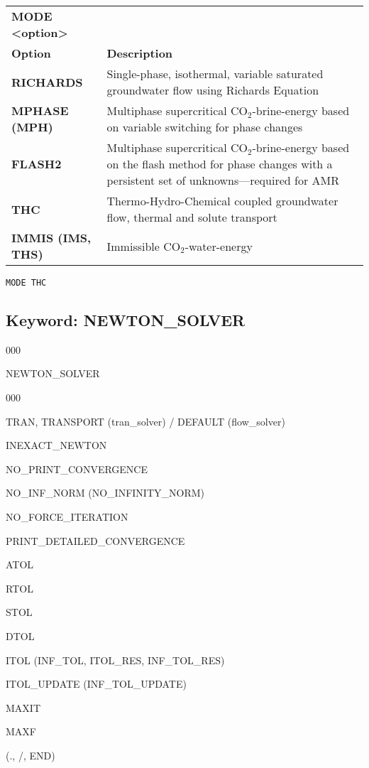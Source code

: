 \documentclass[12pt]{article}
\begin{document}

\begin{center}
\begin{tabularx}{\linewidth}{lX}
\bf MODE <option>\\
\bf Option & \bf Description\\
\bf RICHARDS &Single-phase, isothermal, variable saturated groundwater flow using Richards Equation\\
\bf MPHASE (MPH) &Multiphase supercritical CO$_2$-brine-energy based on variable switching for phase changes\\
\bf FLASH2 &Multiphase supercritical CO$_2$-brine-energy based on the flash method for phase changes with a persistent set of unknowns---required for AMR\\
\bf THC &Thermo-Hydro-Chemical coupled groundwater flow, thermal and solute transport\\
\bf IMMIS (IMS, THS) &Immissible CO$_2$-water-energy\\
\end{tabularx}
\end{center}

\begin{verbatim}
MODE THC
\end{verbatim}


\newpage
\protect\hypertarget{target_newt}{}

\subsection{Keyword: NEWTON\_SOLVER}


\begin{deflist}{000}
\item[NEWTON\_SOLVER] ~
\begin{deflist}{000}
\item[TRAN, TRANSPORT (tran\_solver) / DEFAULT (flow\_solver)]
\item[INEXACT\_NEWTON]
\item[NO\_PRINT\_CONVERGENCE]
\item[NO\_INF\_NORM (NO\_INFINITY\_NORM)]
\item[NO\_FORCE\_ITERATION]
\item[PRINT\_DETAILED\_CONVERGENCE]
\item[ATOL]
\item[RTOL]
\item[STOL]
\item[DTOL]
\item[ITOL (INF\_TOL, ITOL\_RES, INF\_TOL\_RES)]
\item[ITOL\_UPDATE (INF\_TOL\_UPDATE)]
\item[MAXIT]
\item[MAXF]
\end{deflist}
\item[(., /, END)]
\end{deflist}
\end{document}
